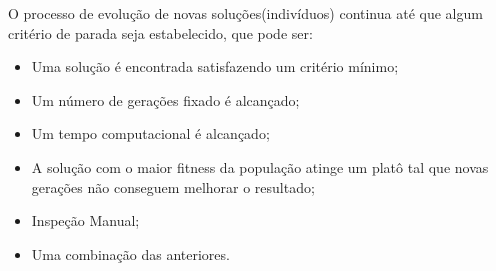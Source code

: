 \documentclass[review]{elsarticle}
\begin{document}
O processo de evolução de novas soluções(indivíduos) continua até que algum critério de parada seja estabelecido, que pode ser:
\begin{itemize}
    \item Uma solução é encontrada satisfazendo um critério mínimo;
    \item Um número de gerações fixado é alcançado;
    \item Um tempo computacional é alcançado;
    \item A solução com o maior fitness da população atinge um platô tal que novas gerações não conseguem melhorar o resultado;
    \item Inspeção Manual;
    \item Uma combinação das anteriores.
\end{itemize}







\end{document}
